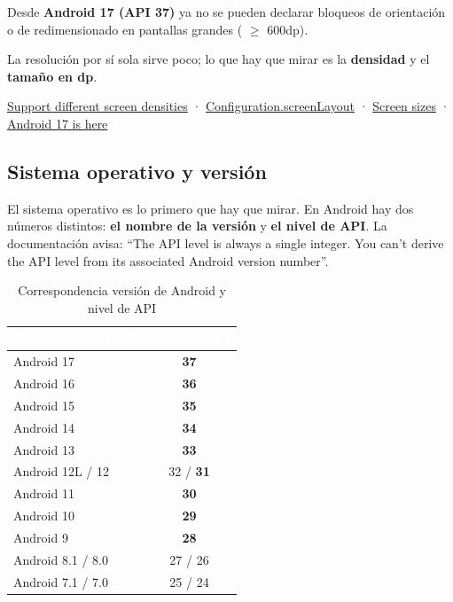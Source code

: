 Desde \textbf{Android 17 (API 37)} ya no se pueden declarar bloqueos de orientación o de redimensionado en pantallas grandes ( $\geq$ 600dp).

 La resolución por sí sola sirve poco; lo que hay que mirar es la \textbf{densidad} y el \textbf{tamaño en dp}.

\begin{fuentesbox}
\href{https://developer.android.com/training/multiscreen/screendensities}{Support different screen densities} ·
\href{https://developer.android.com/reference/android/content/res/Configuration}{Configuration.screenLayout} ·
\href{https://developer.android.com/training/multiscreen/screensizes}{Screen sizes} ·
\href{https://developer.android.com/blog/posts/android-17-is-here}{Android 17 is here}
\end{fuentesbox}

\subsection{Sistema operativo y versión}

El sistema operativo es lo primero que hay que mirar. En Android hay dos números distintos: \textbf{el nombre de la versión} y \textbf{el nivel de API}. La documentación avisa: \enquote{The API level is always a single integer. You can't derive the API level from its associated Android version number}.

\begin{table}[htbp]
\centering
\small
\begin{tabular}{@{}l c@{}}
\toprule
\rowcolor{primary}
\textcolor{white}{\sffamily\bfseries Versión de Android} & \textcolor{white}{\sffamily\bfseries Nivel de API} \\
\midrule
Android 17 & \textbf{37} \\
\rowcolor{soft}
Android 16 & \textbf{36} \\
Android 15 & \textbf{35} \\
\rowcolor{soft}
Android 14 & \textbf{34} \\
Android 13 & \textbf{33} \\
\rowcolor{soft}
Android 12L / 12 & 32 / \textbf{31} \\
Android 11 & \textbf{30} \\
\rowcolor{soft}
Android 10 & \textbf{29} \\
Android 9 & \textbf{28} \\
\rowcolor{soft}
Android 8.1 / 8.0 & 27 / 26 \\
Android 7.1 / 7.0 & 25 / 24 \\
\bottomrule
\end{tabular}
\caption{Correspondencia versión de Android y nivel de API}
\end{table}

